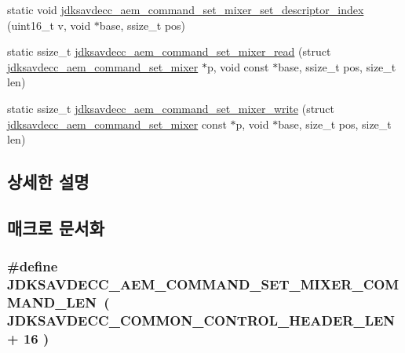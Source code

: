 \begin{DoxyCompactItemize}
\item 
static void \hyperlink{group__command__set__mixer_gabc9cdae53924a8ed78e5cbe59510b373}{jdksavdecc\+\_\+aem\+\_\+command\+\_\+set\+\_\+mixer\+\_\+set\+\_\+descriptor\+\_\+index} (uint16\+\_\+t v, void $\ast$base, ssize\+\_\+t pos)
\item 
static ssize\+\_\+t \hyperlink{group__command__set__mixer_gaa371a45c5c5a358553b9b111ae90258e}{jdksavdecc\+\_\+aem\+\_\+command\+\_\+set\+\_\+mixer\+\_\+read} (struct \hyperlink{structjdksavdecc__aem__command__set__mixer}{jdksavdecc\+\_\+aem\+\_\+command\+\_\+set\+\_\+mixer} $\ast$p, void const $\ast$base, ssize\+\_\+t pos, size\+\_\+t len)
\item 
static ssize\+\_\+t \hyperlink{group__command__set__mixer_gaa1bdb4ef380c08b1f361d2741c6aa828}{jdksavdecc\+\_\+aem\+\_\+command\+\_\+set\+\_\+mixer\+\_\+write} (struct \hyperlink{structjdksavdecc__aem__command__set__mixer}{jdksavdecc\+\_\+aem\+\_\+command\+\_\+set\+\_\+mixer} const $\ast$p, void $\ast$base, size\+\_\+t pos, size\+\_\+t len)
\end{DoxyCompactItemize}


\subsection{상세한 설명}


\subsection{매크로 문서화}
\subsubsection[{\texorpdfstring{J\+D\+K\+S\+A\+V\+D\+E\+C\+C\+\_\+\+A\+E\+M\+\_\+\+C\+O\+M\+M\+A\+N\+D\+\_\+\+S\+E\+T\+\_\+\+M\+I\+X\+E\+R\+\_\+\+C\+O\+M\+M\+A\+N\+D\+\_\+\+L\+EN}{JDKSAVDECC_AEM_COMMAND_SET_MIXER_COMMAND_LEN}}]{\setlength{\rightskip}{0pt plus 5cm}\#define J\+D\+K\+S\+A\+V\+D\+E\+C\+C\+\_\+\+A\+E\+M\+\_\+\+C\+O\+M\+M\+A\+N\+D\+\_\+\+S\+E\+T\+\_\+\+M\+I\+X\+E\+R\+\_\+\+C\+O\+M\+M\+A\+N\+D\+\_\+\+L\+EN~( {\bf J\+D\+K\+S\+A\+V\+D\+E\+C\+C\+\_\+\+C\+O\+M\+M\+O\+N\+\_\+\+C\+O\+N\+T\+R\+O\+L\+\_\+\+H\+E\+A\+D\+E\+R\+\_\+\+L\+EN} + 16 )}\hypertarget{group__command__set__mixer_ga99895088fc524d7953bca73a5d1f4bf9}{}\label{group__command__set__mixer_ga99895088fc524d7953bca73a5d1f4bf9}


